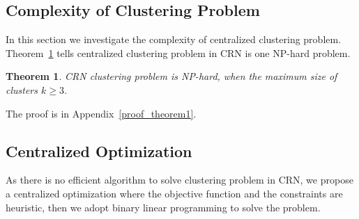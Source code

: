 \documentclass[10pt,journal,compsoc]{IEEEtran}
\theoremstyle{mytheoremstyle}
\newtheorem{theorem}{Theorem}[section]
\theoremstyle{mytheoremstyle}
\theoremstyle{mytheoremstyle}
\newcommand{\ie}{i.e., }
\begin{document}
\subsection{Complexity of Clustering Problem}
In this section we investigate the complexity of centralized clustering problem.
Theorem~\ref{theorem1} tells centralized clustering problem in CRN is one NP-hard problem.

\begin{theorem}
\label{theorem1}
CRN clustering problem is NP-hard, when the maximum size of clusters $k\geqslant 3$.
\end{theorem}
The proof is in Appendix~\ref{proof_theorem1}.



\subsection{Centralized Optimization}
\label{centralized_opt}
As there is no efficient algorithm to solve clustering problem in CRN, we propose a centralized optimization where the objective function and the constraints are heuristic, then we adopt binary linear programming to solve the problem.


\end{document}
